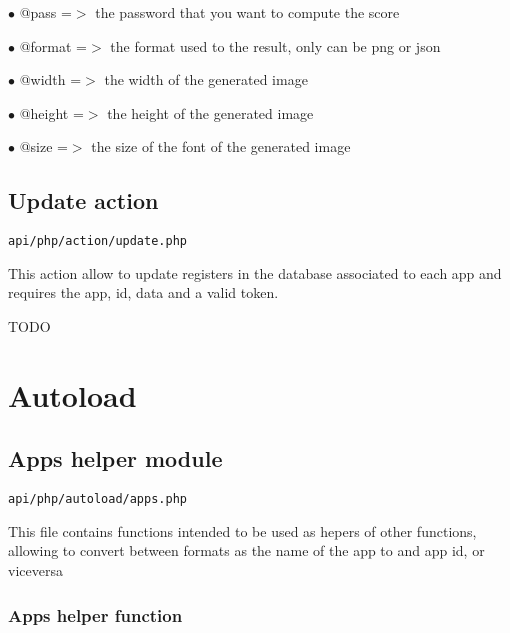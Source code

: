 \documentclass[a4paper]{book}
\begin{document}
\begin{compactitem}
\item[\color{myblue}$\bullet$] @pass   =$>$ the password that you want to compute the score
\item[\color{myblue}$\bullet$] @format =$>$ the format used to the result, only can be png or json
\end{compactitem}

\begin{compactitem}
\item[\color{myblue}$\bullet$] @width  =$>$ the width of the generated image
\item[\color{myblue}$\bullet$] @height =$>$ the height of the generated image
\item[\color{myblue}$\bullet$] @size   =$>$ the size of the font of the generated image
\end{compactitem}

\hypertarget{toc18}{}
\section{Update action}

\begin{lstlisting}
api/php/action/update.php
\end{lstlisting}

This action allow to update registers in the database associated to
each app and requires the app, id, data and a valid token.

TODO


\hypertarget{toc19}{}
\chapter{Autoload}

\hypertarget{toc20}{}
\section{Apps helper module}

\begin{lstlisting}
api/php/autoload/apps.php
\end{lstlisting}

This file contains functions intended to be used as hepers of other functions, allowing to convert
between formats as the name of the app to and app id, or viceversa

\hypertarget{toc21}{}
\subsection{Apps helper function}
\end{document}
